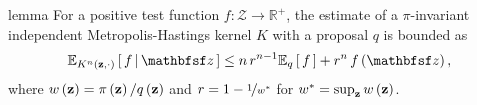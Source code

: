 \begin{theoremEnd}{lemma}\label{thm:imh_expecation}
  For a positive test function \(f : \mathcal{Z} \rightarrow \mathbb{R}^{+}\), the estimate of a \(\pi\)-invariant independent Metropolis-Hastings kernel \(K\) with a proposal \(q\) is bounded as
  \begin{align*}
    \Esub{K^n\left(\vz, \cdot\right)}{ f \,\middle|\, \rvvz }
    \leq
    n \, r^{n-1} 
    \Esub{q}{f}
    +
    {r}^n \, f\left(\rvvz\right),
  \end{align*}
  where \(w\left(\mathbf{z}\right) = \pi\left(\mathbf{z}\right) / q\left(\mathbf{z}\right)\) and \(r = 1 - \nicefrac{1}{w^*}\) for \(w^* = \sup_{\mathbf{z}} w\left(\mathbf{z}\right) \).
\end{theoremEnd}
